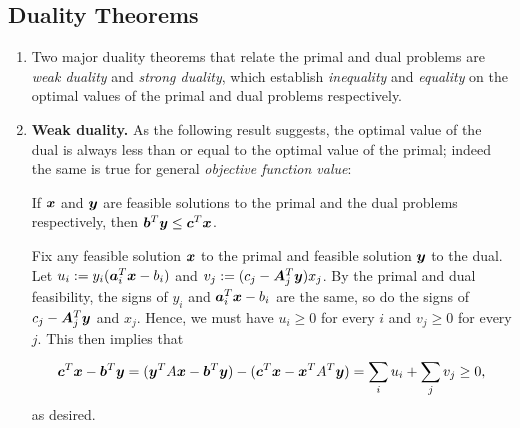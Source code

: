 \subsection{Duality Theorems}
\label{subsect:duality-thms}
\begin{enumerate}
\item Two major duality theorems that relate the primal and dual problems are
\emph{weak duality} and \emph{strong duality}, which establish \emph{inequality}
and \emph{equality} on the optimal values of the primal and dual problems
respectively.
\item \textbf{Weak duality.} As the following result suggests, the optimal
value of the dual is always less than or equal to the optimal value of the
primal; indeed the same is true for general \emph{objective function value}:
\begin{theorem}
\label{thm:weak-duality}
If \(\bm{x}\) and \(\bm{y}\) are feasible solutions to the primal and the
dual problems respectively, then \(\bm{b}^{T}\bm{y}\le\bm{c}^{T}\bm{x}\).
\end{theorem}
\begin{pf}
Fix any feasible solution \(\bm{x}\) to the primal and feasible solution
\(\bm{y}\) to the dual. Let \(u_i:=y_i(\bm{a}_i^{T}\bm{x}-b_i)\) and
\(v_j:=(c_j-\bm{A}_j^{T}\bm{y})x_j\). By the primal and dual feasibility,
the signs of \(y_i\) and \(\bm{a}_i^{T}\bm{x}-b_i\) are the same, so do
the signs of \(c_j-\bm{A}_j^{T}\bm{y}\) and \(x_j\). Hence, we must have
\(u_i\ge 0\) for every \(i\) and \(v_j\ge 0\) for every \(j\). This then implies that
\[
\bm{c}^{T}\bm{x}-\bm{b}^{T}\bm{y}
=(\bm{y}^{T}A\bm{x}-\bm{b}^{T}\bm{y})
-(\bm{c}^{T}\bm{x}-\bm{x}^{T}A^{T}\bm{y})
=\sum_{i}^{}u_i+\sum_{j}^{}v_j
\ge 0,
\]
as desired.
\end{pf}


\end{enumerate}
